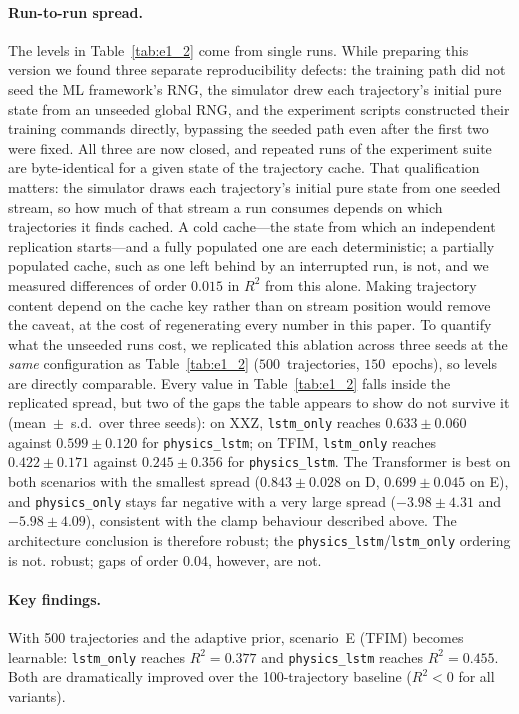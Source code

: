 \documentclass[twocolumn,10pt]{article}
\begin{document}
\paragraph{Run-to-run spread.}
The levels in Table~\ref{tab:e1_2} come from single runs.
While preparing this version we found three separate reproducibility
defects: the training path did not seed the ML framework's RNG, the
simulator drew each trajectory's initial pure state from an unseeded
global RNG, and the experiment scripts constructed their training
commands directly, bypassing the seeded path even after the first two
were fixed.
All three are now closed, and repeated runs of the experiment suite are
byte-identical for a given state of the trajectory cache.
That qualification matters: the simulator draws each trajectory's
initial pure state from one seeded stream, so how much of that stream a
run consumes depends on which trajectories it finds cached.
A cold cache---the state from which an independent replication
starts---and a fully populated one are each deterministic; a partially
populated cache, such as one left behind by an interrupted run, is not,
and we measured differences of order $0.015$ in $R^2$ from this alone.
Making trajectory content depend on the cache key rather than on stream
position would remove the caveat, at the cost of regenerating every
number in this paper.
To quantify what the unseeded runs cost, we replicated this ablation
across three seeds at the \emph{same} configuration as
Table~\ref{tab:e1_2} ($500$~trajectories, $150$~epochs), so levels are
directly comparable.
Every value in Table~\ref{tab:e1_2} falls inside the replicated spread,
but two of the gaps the table appears to show do not survive it
(mean~$\pm$~s.d.\ over three seeds):
on XXZ, \texttt{lstm\_only} reaches $0.633 \pm 0.060$ against
$0.599 \pm 0.120$ for \texttt{physics\_lstm}; on TFIM,
\texttt{lstm\_only} reaches $0.422 \pm 0.171$ against
$0.245 \pm 0.356$ for \texttt{physics\_lstm}.
The Transformer is best on both scenarios with the smallest spread
($0.843 \pm 0.028$ on D, $0.699 \pm 0.045$ on E), and
\texttt{physics\_only} stays far negative with a very large spread
($-3.98 \pm 4.31$ and $-5.98 \pm 4.09$), consistent with the clamp
behaviour described above.
The architecture conclusion is therefore robust; the
\texttt{physics\_lstm}/\texttt{lstm\_only} ordering is not.
robust; gaps of order $0.04$, however, are not.

\paragraph{Key findings.}
With 500 trajectories and the adaptive prior, scenario~E (TFIM) becomes
learnable: \texttt{lstm\_only} reaches $R^2 = 0.377$ and
\texttt{physics\_lstm} reaches $R^2 = 0.455$.
Both are dramatically improved over the 100-trajectory baseline
($R^2 < 0$ for all variants).
\end{document}
